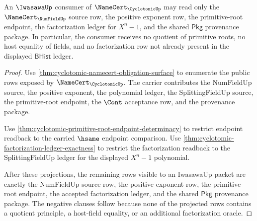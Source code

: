 \begin{theorem}
\label{thm:cyclotomic-iwasawa-source-boundary}
An $\IwasawaUp$ consumer of $\NameCert_{\CyclotomicUp}$ may read only the $\NameCert_{\NumFieldUp}$ source row, the positive exponent row, the primitive-root endpoint, the factorization ledger for $X^n-1$, and the shared $\mathsf{Pkg}$ provenance package. In particular, the consumer receives no quotient of primitive roots, no host equality of fields, and no factorization row not already present in the displayed $\mathsf{BHist}$ ledger.
\end{theorem}
\begin{proof}
Use \autoref{thm:cyclotomic-namecert-obligation-surface} to enumerate the public rows exposed by $\NameCert_{\CyclotomicUp}$. The carrier contributes the NumFieldUp source, the positive exponent, the polynomial ledger, the SplittingFieldUp source, the primitive-root endpoint, the $\Cont$ acceptance row, and the provenance package.

Use \autoref{thm:cyclotomic-primitive-root-endpoint-determinacy} to restrict endpoint readback to the carried $\hsame$ endpoint comparison. Use \autoref{thm:cyclotomic-factorization-ledger-exactness} to restrict the factorization readback to the SplittingFieldUp ledger for the displayed $X^n-1$ polynomial.

After these projections, the remaining rows visible to an IwasawaUp packet are exactly the NumFieldUp source row, the positive exponent row, the primitive-root endpoint, the accepted factorization ledger, and the shared $\mathsf{Pkg}$ provenance package. The negative clauses follow because none of the projected rows contains a quotient principle, a host-field equality, or an additional factorization oracle.
\end{proof}

